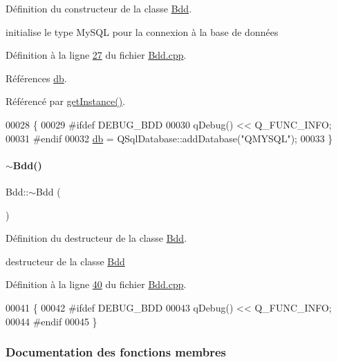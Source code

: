 Définition du constructeur de la classe \hyperlink{class_bdd}{Bdd}. 

initialise le type My\+S\+QL pour la connexion à la base de données 

Définition à la ligne \hyperlink{_bdd_8cpp_source_l00027}{27} du fichier \hyperlink{_bdd_8cpp_source}{Bdd.\+cpp}.



Références \hyperlink{_bdd_8h_source_l00063}{db}.



Référencé par \hyperlink{_bdd_8cpp_source_l00053}{get\+Instance()}.


\begin{DoxyCode}
00028 \{
00029 \textcolor{preprocessor}{    #ifdef DEBUG\_BDD}
00030     qDebug() << Q\_FUNC\_INFO;
00031 \textcolor{preprocessor}{    #endif}
00032     \hyperlink{class_bdd_a8628c1686deda86999f86689c3e7268e}{db} = QSqlDatabase::addDatabase(\textcolor{stringliteral}{"QMYSQL"});
00033 \}
\end{DoxyCode}
\mbox{\label{class_bdd_a5029277f27f8cfcf9d8603fb331a15dd}} 
\paragraph{\texorpdfstring{$\sim$\+Bdd()}{~Bdd()}}
{\footnotesize\ttfamily Bdd\+::$\sim$\+Bdd (\begin{DoxyParamCaption}{ }\end{DoxyParamCaption})\hspace{0.3cm}{\ttfamily [private]}}



Définition du destructeur de la classe \hyperlink{class_bdd}{Bdd}. 

destructeur de la classe \hyperlink{class_bdd}{Bdd} 

Définition à la ligne \hyperlink{_bdd_8cpp_source_l00040}{40} du fichier \hyperlink{_bdd_8cpp_source}{Bdd.\+cpp}.


\begin{DoxyCode}
00041 \{
00042 \textcolor{preprocessor}{    #ifdef DEBUG\_BDD}
00043     qDebug() << Q\_FUNC\_INFO;
00044 \textcolor{preprocessor}{    #endif}
00045 \}
\end{DoxyCode}


\subsubsection{Documentation des fonctions membres}
\mbox{\label{class_bdd_a1a234e773787295f521d66685149176b}} 
